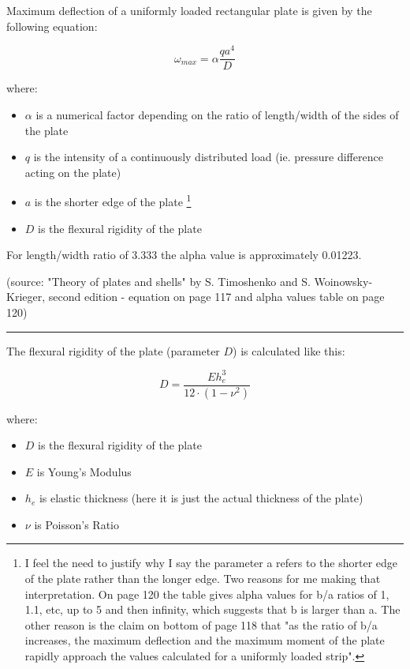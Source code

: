 \documentclass[a4paper]{article}
\begin{document}
    \medskip
    
    Maximum deflection of a uniformly loaded rectangular plate is given by the following equation:
    
    $$ \omega_{max} = \alpha\frac{qa^4}{D} $$
        
    where:
    
    \begin{itemize}
    	\item $\alpha$ is a numerical factor depending on the ratio of length/width of the sides of the plate
    	
    	\item $q$ is the intensity of a continuously distributed load (ie. pressure difference acting on the plate)
    	
    	\item $a$ is the shorter edge of the plate \footnote{I feel the need to justify why I say the parameter a refers to the shorter edge of the plate rather than the longer edge. Two reasons for me making that interpretation. On page 120 the table gives alpha values for b/a ratios of 1, 1.1, etc, up to 5 and then infinity, which suggests that b is larger than a. The other reason is the claim on bottom of page 118 that "as the ratio of b/a increases, the maximum deflection and the maximum moment of the plate rapidly approach the values calculated for a uniformly loaded strip".}
    	
    	\item $D$ is the flexural rigidity of the plate
    \end{itemize}
    
    For length/width ratio of 3.333 the alpha value is approximately 0.01223.
    
    (source: "Theory of plates and shells" by S. Timoshenko and S. Woinowsky-Krieger, second edition - equation on page 117 and alpha values table on page 120)
    
    \begin{center}
    	\rule{0.8\linewidth}{0.5pt}
    \end{center}
	
	The flexural rigidity of the plate (parameter $D$) is calculated like this:
	
	$$ D =  \frac{E h_e^3}{12 \cdot (1 - \nu^2)}$$
	
	where:
	
	\begin{itemize}
		\item $D$ is the flexural rigidity of the plate
		
		\item $E$ is Young's Modulus
		
		\item $h_e$ is elastic thickness (here it is just the actual thickness of the plate)
		
		\item $\nu$ is Poisson's Ratio
	\end{itemize}
	
\end{document}
